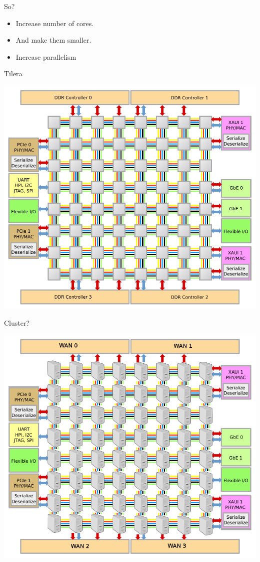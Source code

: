 \documentclass[14pt]{beamer}
\begin{document}
\begin{frame}{So?}
    \begin{itemize}
        \item Increase number of cores.
        \item And make them smaller.
            \pause
        \item \alert{Increase parallelism}
    \end{itemize}
\end{frame}

\begin{frame}{Tilera}
    \pause
    \begin{center}
        \includegraphics[height=0.8\textheight]{images/tile64.pdf}
    \end{center}
\end{frame}

\begin{frame}{Cluster?}
    \begin{center}
        \includegraphics[height=0.8\textheight]{images/computer_clusterb.png}
    \end{center}
\end{frame}
\end{document}
